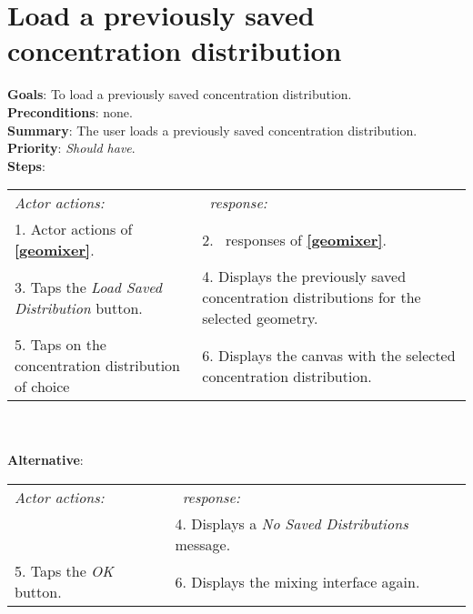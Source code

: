   \section{Load a previously saved concentration distribution}
  \label{loadsavedist}
  \textbf{Goals}: To load a previously saved concentration distribution.\\
  \textbf{Preconditions}: none.\\
  \textbf{Summary}: The user loads a previously saved concentration distribution.\\
  \textbf{Priority}: \emph{Should have}.\\
  \textbf{Steps}: \\
  \begin{tabular}{ p{} p{} }
  	\emph{Actor actions:} & \emph{\projectname\ response:} \\
  	1. Actor actions of \textbf{\ref{geomixer}}. & 2. \projectname\ responses of \textbf{\ref{geomixer}}. \\
	3. Taps the \emph{Load Saved Distribution} button. & 4. Displays the previously saved concentration distributions for the selected geometry. \\
	5. Taps on the concentration distribution of choice & 6. Displays the canvas with the selected concentration distribution. \\
	\end{tabular}
	        \\
     \\\textbf{Alternative}: \\
    \begin{tabular}{ p{} p{} }
  	\emph{Actor actions:} & \emph{\projectname\ response:} \\
            & 4. Displays a \emph{No Saved Distributions} message. \\
    5. Taps the \emph{OK} button. & 6. Displays the mixing interface again. \\
  \end{tabular}
  
